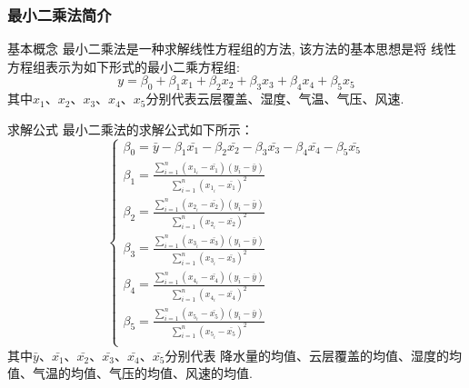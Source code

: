 \documentclass[10pt]{beamer}
\begin{document}
\begin{frame}
	\frametitle{最小二乘法简介}
	\begin{block}{基本概念}
		最小二乘法是一种求解线性方程组的方法, 该方法的基本思想是将
		线性方程组表示为如下形式的最小二乘方程组:
		\begin{equation}
			y = \beta_0 + \beta_1 x_1 + \beta_2 x_2 + \beta_3 x_3 + \beta_4 x_4 + \beta_5 x_5
		\end{equation}
		其中$x_1$、$x_2$、$x_3$、$x_4$、$x_5$分别代表云层覆盖、湿度、气温、气压、风速.
	\end{block}
	\begin{block}{求解公式}
		最小二乘法的求解公式如下所示：
		\begin{equation}
			\begin{cases}
				\beta_0 = \bar{y} - \beta_1 \bar{x_1} - \beta_2 \bar{x_2} - \beta_3 \bar{x_3} - \beta_4 \bar{x_4} - \beta_5 \bar{x_5} \\
				\beta_1 = \frac{\sum_{i=1}^n (x_{1_i} - \bar{x_1}) (y_i - \bar{y})}{\sum_{i=1}^n (x_{1_i} - \bar{x_1})^2}             \\
				\beta_2 = \frac{\sum_{i=1}^n (x_{2_i} - \bar{x_2}) (y_i - \bar{y})}{\sum_{i=1}^n (x_{2_i} - \bar{x_2})^2}             \\
				\beta_3 = \frac{\sum_{i=1}^n (x_{3_i} - \bar{x_3}) (y_i - \bar{y})}{\sum_{i=1}^n (x_{3_i} - \bar{x_3})^2}             \\
				\beta_4 = \frac{\sum_{i=1}^n (x_{4_i} - \bar{x_4}) (y_i - \bar{y})}{\sum_{i=1}^n (x_{4_i} - \bar{x_4})^2}             \\
				\beta_5 = \frac{\sum_{i=1}^n (x_{5_i} - \bar{x_5}) (y_i - \bar{y})}{\sum_{i=1}^n (x_{5_i} - \bar{x_5})^2}             \\
			\end{cases}
		\end{equation}
		其中$\bar{y}$、$\bar{x_1}$、$\bar{x_2}$、$\bar{x_3}$、$\bar{x_4}$、$\bar{x_5}$分别代表
		降水量的均值、云层覆盖的均值、湿度的均值、气温的均值、气压的均值、风速的均值.
	\end{block}
\end{frame}
\end{document}
